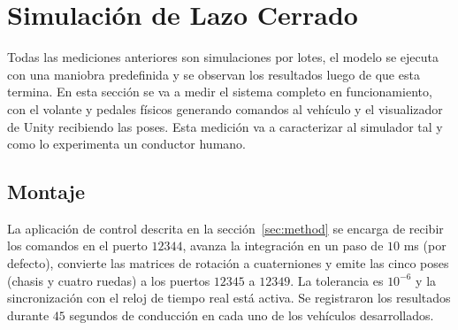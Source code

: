 



\section{Simulación de Lazo Cerrado}

Todas las mediciones anteriores son simulaciones por lotes, el modelo se ejecuta con una maniobra predefinida y se observan los resultados luego de que esta termina. En esta sección se va a medir el sistema completo en funcionamiento, con el volante y pedales físicos generando comandos al vehículo y el visualizador de Unity recibiendo las poses. Esta medición va a caracterizar al simulador tal y como lo experimenta un conductor humano.

\subsection{Montaje}

La aplicación de control descrita en la sección~\ref{sec:method} se encarga de recibir los comandos en el puerto $12344$, avanza la integración en un paso de $10$ ms (por defecto), convierte las matrices de rotación a cuaterniones y emite las cinco poses (chasis y cuatro ruedas) a los puertos $12345$ a $12349$. La tolerancia es $10^{-6}$ y la sincronización con el reloj de tiempo real está activa. Se registraron los resultados durante $45$ segundos de conducción en cada uno de los vehículos desarrollados.

